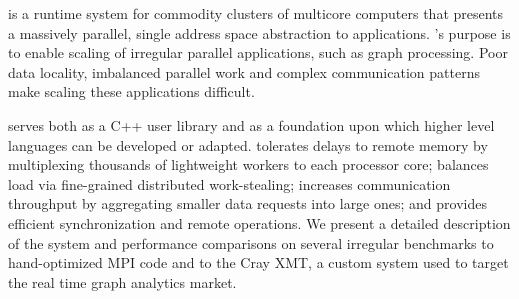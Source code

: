 \Grappa is a runtime system for commodity clusters of multicore computers that
presents a massively parallel, single address space abstraction to
applications. \Grappa's purpose is to enable scaling of irregular
parallel applications, such as graph processing. Poor data locality, imbalanced parallel
work and complex communication patterns make scaling these applications difficult.

\Grappa serves both as a C++ user library and as a foundation upon which
higher level languages can be developed or adapted. \Grappa tolerates delays
to remote memory by multiplexing thousands of lightweight workers
to each processor core; balances load via fine-grained distributed
work-stealing; increases communication throughput by aggregating
smaller data requests into large ones; and provides efficient synchronization
and remote operations. We present a detailed description of the \Grappa
system and
performance comparisons on several irregular benchmarks to hand-optimized MPI code and to
the Cray XMT, a custom system used to target the real time graph analytics
market.
